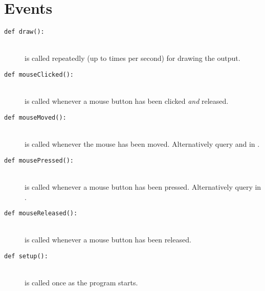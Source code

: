 \section{Events}
\begin{description}
\item[\texttt{def draw():}] \hfill \\
	is called repeatedly (up to  times per second) for drawing the output.
\item[\texttt{def mouseClicked():}] \hfill \\
	is called whenever a mouse button has been clicked \emph{and} released.
\item[\texttt{def mouseMoved():}] \hfill \\
	is called whenever the mouse has been moved. Alternatively query  and  in .
\item[\texttt{def mousePressed():}] \hfill \\
	is called whenever a mouse button has been pressed. Alternatively query  in .
\item[\texttt{def mouseReleased():}] \hfill \\
	is called whenever a mouse button has been released.
\item[\texttt{def setup():}] \hfill \\
	is called once as the program starts.
\end{description}


